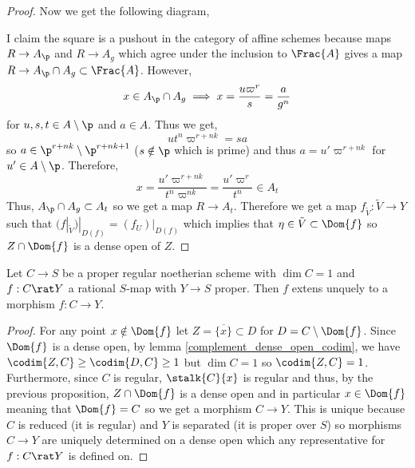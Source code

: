 \documentclass[12pt]{article}
\begin{document}
\begin{proof}
Now we get the following diagram, 
\begin{center}
\end{center}
I claim the square is a pushout in the category of affine schemes because maps $R \to A_\p$ and $R \to A_g$ which agree under the inclusion to $\Frac{A}$ gives a map $R \to A_\p \cap A_g \subset \Frac{A}$. However,
\[ x \in A_\p \cap A_g \implies x = \frac{u \varpi^r}{s} = \frac{a}{g^n} \]
for $u, s, t \in A \setminus \p$ and $a \in A$. Thus we get,
\[ u t^n \varpi^{r + nk} = s a \]
so $a \in \p^{r + nk} \setminus \p^{r + nk + 1}$ ($s \notin \p$ which is prime) and thus $a = u' \varpi^{r + nk}$ for $u' \in A \setminus \p$. Therefore,
\[ x = \frac{u' \varpi^{r + nk}}{t^n \varpi^{nk}} = \frac{u' \varpi^{r}}{t^n} \in A_t \]
Thus, $A_\p \cap A_g \subset A_t$ so we get a map $R \to A_t$. Therefore we get a map $f_{\tilde{V}} : \tilde{V} \to Y$ such that $(f|_{\tilde{V}})|_{D(f)} = (f_U)|_{D(f)}$ which implies that $\eta \in \tilde{V} \subset \Dom{f}$ so $Z \cap \Dom{f}$ is a dense open of $Z$. 
\end{proof}

\begin{prop}
Let $C \to S$ be a proper regular noetherian scheme with $\dim{C} = 1$ and $f : C \rat Y$ a rational $S$-map with $Y \to S$ proper. Then $f$ extens unquely to a morphism $f : C \to Y$. 
\end{prop}

\begin{proof}
For any point $x \notin \Dom{f}$ let $Z = \overline{\{ x \}} \subset D$ for $D = C \setminus \Dom{f}$. Since $\Dom{f}$ is a dense open, by lemma \ref{complement_dense_open_codim}, we have $\codim{Z, C} \ge \codim{D, C} \ge 1$ but $\dim{C} = 1$ so $\codim{Z, C} = 1$. Furthermore, since $C$ is regular, $\stalk{C}{x}$ is regular and thus, by the previous proposition, $Z \cap \Dom{f}$ is a dense open and in particular $x \in \Dom{f}$ meaning that $\Dom{f} = C$ so we get a morphism $C \to Y$. This is unique because $C$ is reduced (it is regular) and $Y$ is separated (it is proper over $S$) so morphisms $C \to Y$ are uniquely determined on a dense open which any representative for $f : C \rat Y$ is defined on.   
\end{proof}
\end{document}
